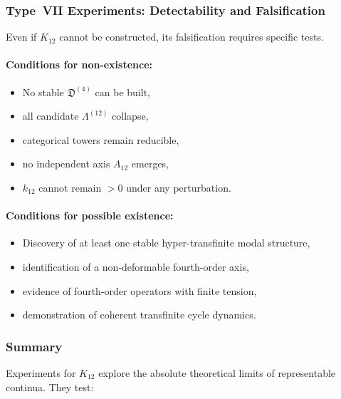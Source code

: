 \subsubsection{Type~VII Experiments: Detectability and Falsification}

Even if $K_{12}$ cannot be constructed, its falsification requires
specific tests.

\paragraph{Conditions for non-existence:}

\begin{itemize}
    \item No stable $\mathfrak{D}^{(4)}$ can be built,
    \item all candidate $\Lambda^{(12)}$ collapse,
    \item categorical towers remain reducible,
    \item no independent axis $A_{12}$ emerges,
    \item $k_{12}$ cannot remain $> 0$ under any perturbation.
\end{itemize}

\paragraph{Conditions for possible existence:}

\begin{itemize}
    \item Discovery of at least one stable hyper-transfinite modal
          structure,
    \item identification of a non-deformable fourth-order axis,
    \item evidence of fourth-order operators with finite tension,
    \item demonstration of coherent transfinite cycle dynamics.
\end{itemize}



\subsubsection{Summary}

Experiments for $K_{12}$ explore the absolute theoretical limits of
representable continua.
They test:


